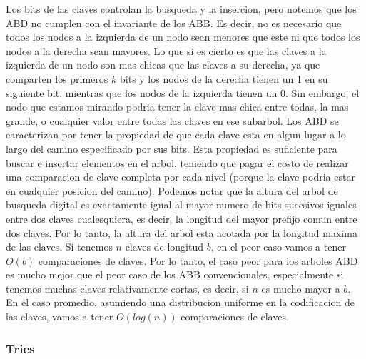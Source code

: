\documentclass[10pt,a4paper]{article}
\begin{document}
Los bits de las claves controlan la busqueda y la insercion, pero notemos que los ABD no cumplen con el invariante de los ABB. Es decir, no es necesario que todos los nodos a la izquierda de un nodo sean menores que este ni que todos los nodos a la derecha sean mayores. Lo que si es cierto es que las claves a la izquierda de un nodo son mas chicas que las claves a su derecha, ya que comparten los primeros $k$ bits y los nodos de la derecha tienen un 1 en su siguiente bit, mientras que los nodos de la izquierda tienen un 0. Sin embargo, el nodo que estamos mirando podria tener la clave mas chica entre todas, la
mas grande, o cualquier valor entre todas las claves en ese subarbol.
\newline
\newline
Los ABD se caracterizan por tener la propiedad de que cada clave esta en algun lugar a lo largo del camino especificado por sus bits. Esta propiedad es suficiente para buscar e insertar elementos en el arbol, teniendo que pagar el costo de realizar una comparacion de clave completa por cada nivel (porque la clave podria estar en cualquier posicion del camino). Podemos notar que la altura del arbol de busqueda digital es exactamente igual al mayor numero de bits sucesivos iguales entre dos claves cualesquiera, es decir, la longitud del mayor prefijo comun entre dos claves. Por lo tanto, la altura del arbol esta acotada
por la longitud maxima de las claves. Si tenemos $n$ claves de longitud $b$, en el peor caso vamos a tener $O(b)$ comparaciones de claves. Por lo tanto, el caso peor para los arboles ABD es mucho mejor que el peor caso de los ABB convencionales, especialmente si tenemos muchas claves relativamente cortas, es decir, si $n$ es mucho mayor a $b$. En el caso promedio, asumiendo una distribucion uniforme en la codificacion de las claves, vamos a tener $O(log(n))$ comparaciones de claves.

\subsubsection{Tries}
\end{document}
